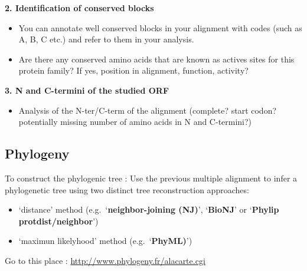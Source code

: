 \documentclass[
]{book}
\providecommand{\tightlist}{%
  \setlength{\itemsep}{0pt}\setlength{\parskip}{0pt}}
\begin{document}
\textbf{2. Identification of conserved blocks}

\begin{itemize}
\tightlist
\item
  You can annotate well conserved blocks in your alignment with codes (such as A, B, C etc.) and refer to them in your analysis.
\item
  Are there any conserved amino acids that are known as actives sites for this protein family? If yes, position in alignment, function, activity?
\end{itemize}

\textbf{3. N and C-termini of the studied ORF}

\begin{itemize}
\tightlist
\item
  Analysis of the N-ter/C-term of the alignment (complete? start codon? potentially missing number of amino acids in N and C-termini?)
\end{itemize}

\hypertarget{phylogeny}{%
\subsection{Phylogeny}\label{phylogeny}}

To construct the phylogenic tree :
Use the previous multiple alignment to infer a phylogenetic tree using two distinct tree reconstruction approaches:

\begin{itemize}
\tightlist
\item
  `distance' method (e.g.~`\textbf{neighbor-joining (NJ)}', `\textbf{BioNJ}' or `\textbf{Phylip protdist/neighbor}')
\item
  `maximun likelyhood' method (e.g.~`\textbf{PhyML)}')
\end{itemize}

Go to this place : \url{http://www.phylogeny.fr/alacarte.cgi}
\end{document}
